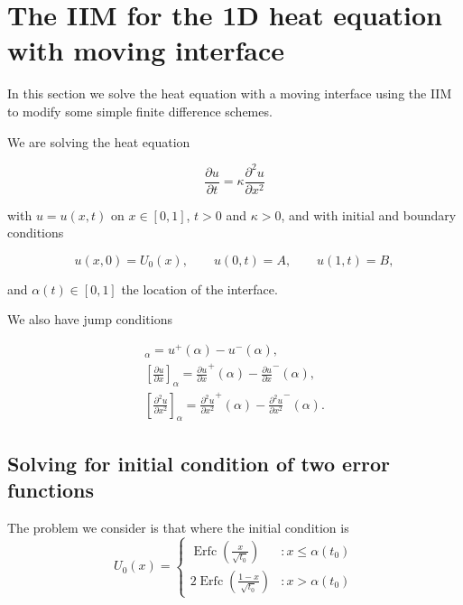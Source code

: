 \section{The IIM for the 1D heat equation with moving interface}

In this section we solve the heat equation with a moving interface using the IIM to modify some simple finite difference schemes.

We are solving the heat equation

\begin{equation}
    \frac{\partial u}{\partial t} = \kappa \frac{\partial^2 u}{\partial x^2}
\end{equation}

with $u=u(x,t)$ on $x \in [0,1]$, $t > 0$ and $\kappa > 0$, and with initial and boundary conditions

\begin{equation}
    u(x,0) = U_0(x), \qquad u(0,t) = A, \qquad u(1,t) = B,
\end{equation}

and $\alpha (t) \in [0,1]$ the location of the interface.

We also have jump conditions

\begin{eqnarray}
    [u]_\alpha  =  u^+(\alpha) - u^-(\alpha), \\
    \left[\frac{\partial u}{\partial x}\right]_\alpha  =  \frac{\partial u}{\partial x}^+(\alpha) - \frac{\partial u}{\partial x}^-(\alpha), \\
    \left[\frac{\partial^2 u}{\partial x^2}\right]_\alpha  =  \frac{\partial^2 u}{\partial x^2}^+(\alpha) - \frac{\partial^2 u}{\partial x^2}^-(\alpha). 
\end{eqnarray}

\subsection{Solving for initial condition of two error functions}

The problem we consider is that where the initial condition is 
\begin{equation}
    U_0(x) = \left\{
        \begin{array}{lr}
            \operatorname{Erfc}(\frac{x}{\sqrt{t_0}}) & : x \leq \alpha(t_0) \\
            2 \operatorname{Erfc}(\frac{1-x}{\sqrt{t_0}}) & : x > \alpha(t_0)
        \end{array}
    \right.
\end{equation}

